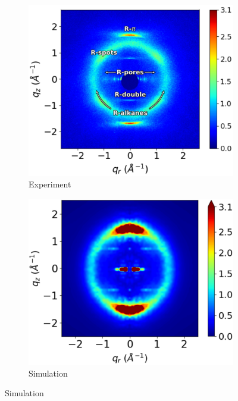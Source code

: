 \documentclass{article}
\begin{document}
  \begin{figure}
  	\centering
  	\vspace{-0.5cm}
    \begin{subfigure}{0.49\linewidth}
    	\includegraphics[width=\linewidth]{WAXS_annotated_words.pdf}
        \caption{Experiment}\label{fig:WAXS}
    \end{subfigure}
	\begin{subfigure}{0.49\linewidth}
        \includegraphics[width=\linewidth]{solvated_offset_rzplot_1.pdf}
        \caption{Simulation}\label{fig:solvated_XRD}   

\end{subfigure}
\end{figure}
\end{document}
